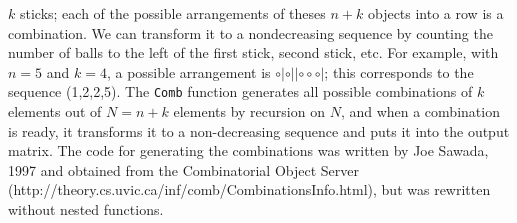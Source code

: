 \documentclass[reqno]{amsart}
\begin{document}
$k$ sticks; each of the possible arrangements of theses $n+k$ objects into a row 
is a combination. We can transform it to a nondecreasing sequence by counting the
number of balls to the left of the first stick, second stick, etc. For example,
with $n=5$ and $k=4$, a possible arrangement is $\circ | \circ ||\circ\circ\circ|$; 
this corresponds to the sequence (1,2,2,5). The \texttt{Comb} function generates
all possible combinations of $k$ elements out of $N=n+k$ elements by recursion
on $N$, and when a combination is ready, it transforms it to a non-decreasing
sequence and puts it into the output matrix. The code for generating the combinations
was written by  Joe Sawada, 1997  and obtained from the Combinatorial Object
Server (http://theory.cs.uvic.ca/inf/comb/CombinationsInfo.html), but was rewritten
without nested functions.
\end{document}
